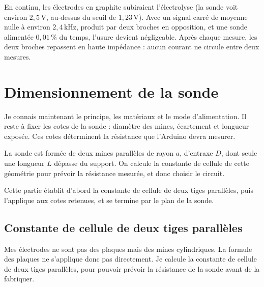 \documentclass[11pt,a4paper]{article}
\newcommand{\U}[1]{\,\mathrm{#1}}
\begin{document}
\begin{retenir}
En continu, les électrodes en graphite subiraient l'électrolyse (la sonde voit environ $2{,}5\U{V}$, au-dessus du seuil de $1{,}23\U{V}$). Avec un signal carré de moyenne nulle à environ $2{,}4\U{kHz}$, produit par deux broches en opposition, et une sonde alimentée $0{,}01\U{\%}$ du temps, l'usure devient négligeable. Après chaque mesure, les deux broches repassent en haute impédance : aucun courant ne circule entre deux mesures.
\end{retenir}

\newpage
\section{Dimensionnement de la sonde}
\label{sec:dimension}

Je connais maintenant le principe, les matériaux et le mode d'alimentation. Il reste à fixer les cotes de la sonde : diamètre des mines, écartement et longueur exposée. Ces cotes déterminent la résistance que l'Arduino devra mesurer.


La sonde est formée de deux mines parallèles de rayon $a$, d'entraxe $D$, dont seule une longueur $L$ dépasse du support. On calcule la constante de cellule de cette géométrie pour prévoir la résistance mesurée, et donc choisir le circuit.

Cette partie établit d'abord la constante de cellule de deux tiges parallèles, puis l'applique aux cotes retenues, et se termine par le plan de la sonde.

\subsection{Constante de cellule de deux tiges parallèles}

Mes électrodes ne sont pas des plaques mais des mines cylindriques. La formule des plaques ne s'applique donc pas directement. Je calcule la constante de cellule de deux tiges parallèles, pour pouvoir prévoir la résistance de la sonde avant de la fabriquer.
\end{document}
